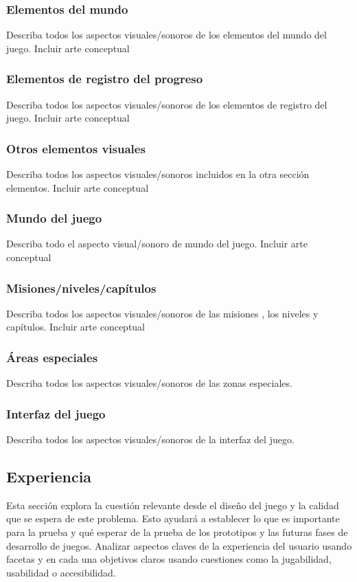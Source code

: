 \subsubsection{Elementos del mundo}
Describa todos los aspectos visuales/sonoros de los elementos del mundo del juego. Incluir arte conceptual

\subsubsection{Elementos de registro del progreso}
Describa todos los aspectos visuales/sonoros de los elementos de registro del juego. Incluir arte conceptual

\subsubsection{Otros elementos visuales}
Describa todos los aspectos visuales/sonoros incluidos en la otra sección elementos. Incluir arte conceptual

\subsubsection{Mundo del juego}
Describa todo el aspecto visual/sonoro de mundo del juego. Incluir arte conceptual

\subsubsection{Misiones/niveles/capítulos}
Describa todos los aspectos visuales/sonoros de las misiones , los niveles y capítulos. Incluir arte conceptual

\subsubsection{Áreas especiales}
Describa todos los aspectos visuales/sonoros de las zonas especiales.

\subsubsection{Interfaz del juego}
Describa todos los aspectos visuales/sonoros de la interfaz del juego.

\subsection{Experiencia}
Esta sección explora la cuestión relevante desde el diseño del juego y la calidad que se espera de este problema. Esto ayudará a establecer lo que es importante para la prueba y qué esperar de la prueba de los prototipos y las futuras fases de desarrollo de juegos. Analizar aspectos claves de la experiencia del usuario usando facetas y en cada una objetivos claros usando cuestiones como la jugabilidad, usabilidad o accesibilidad.

